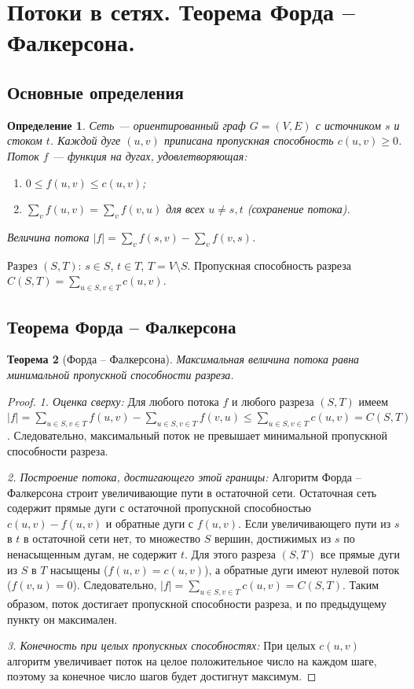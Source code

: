 \documentclass{article}
\theoremstyle{plain}
\newtheorem{theorem}{Теорема}[section]
\newtheorem{definition}[theorem]{Определение}
\begin{document}
\section{Потоки в сетях. Теорема Форда – Фалкерсона.}
\subsection{Основные определения}
\begin{definition}
Сеть — ориентированный граф $G=(V,E)$ с источником $s$ и стоком $t$. Каждой дуге $(u,v)$ приписана пропускная способность $c(u,v) \ge 0$. Поток $f$ — функция на дугах, удовлетворяющая:
\begin{enumerate}
\item $0 \le f(u,v) \le c(u,v)$;
\item $\sum_{v} f(u,v) = \sum_{v} f(v,u)$ для всех $u \neq s,t$ (сохранение потока).
\end{enumerate}
Величина потока $|f| = \sum_{v} f(s,v) - \sum_{v} f(v,s)$.
\end{definition}

Разрез $(S,T)$: $s \in S$, $t \in T$, $T = V \setminus S$. Пропускная способность разреза $C(S,T) = \sum_{u\in S, v\in T} c(u,v)$.

\subsection{Теорема Форда – Фалкерсона}
\begin{theorem}[Форда – Фалкерсона]
Максимальная величина потока равна минимальной пропускной способности разреза.
\end{theorem}
\begin{proof}
\textit{1. Оценка сверху:} Для любого потока $f$ и любого разреза $(S,T)$ имеем $|f| = \sum_{u\in S, v\in T} f(u,v) - \sum_{u\in S, v\in T} f(v,u) \le \sum_{u\in S, v\in T} c(u,v) = C(S,T)$. Следовательно, максимальный поток не превышает минимальной пропускной способности разреза.

\textit{2. Построение потока, достигающего этой границы:} Алгоритм Форда – Фалкерсона строит увеличивающие пути в остаточной сети. Остаточная сеть содержит прямые дуги с остаточной пропускной способностью $c(u,v)-f(u,v)$ и обратные дуги с $f(u,v)$. Если увеличивающего пути из $s$ в $t$ в остаточной сети нет, то множество $S$ вершин, достижимых из $s$ по ненасыщенным дугам, не содержит $t$. Для этого разреза $(S,T)$ все прямые дуги из $S$ в $T$ насыщены ($f(u,v)=c(u,v)$), а обратные дуги имеют нулевой поток ($f(v,u)=0$). Следовательно, $|f| = \sum_{u\in S, v\in T} c(u,v) = C(S,T)$. Таким образом, поток достигает пропускной способности разреза, и по предыдущему пункту он максимален.

\textit{3. Конечность при целых пропускных способностях:} При целых $c(u,v)$ алгоритм увеличивает поток на целое положительное число на каждом шаге, поэтому за конечное число шагов будет достигнут максимум.
\end{proof}
\end{document}
